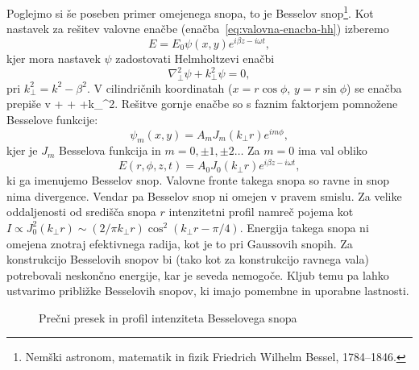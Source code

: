 Poglejmo si še poseben primer omejenega snopa, to je Besselov
snop\footnote{Nemški astronom, matematik in fizik Friedrich Wilhelm Bessel, 1784--1846.}. 
Kot nastavek za rešitev valovne enačbe (enačba~\ref{eq:valovna-enacba-hh})
izberemo
\begin{equation}
E=E_{0}\psi(x,y)e^{i\beta z-i\omega t},
\end{equation}
kjer mora nastavek $\psi$ zadostovati Helmholtzevi enačbi
\begin{equation}
\nabla_{\perp}^{2}\psi+k_{\perp}^{2}\psi=0,
\end{equation}
pri $k_{\perp}^{2}=k^{2}-\beta^{2}$. V cilindričnih
koordinatah ($x=r\cos\phi$, $y=r\sin\phi$) se enačba prepiše v 
\beq
{}+ 
+ +k_{\perp}^{2}.
\eeq
Rešitve gornje enačbe so s faznim faktorjem pomnožene Besselove funkcije:
\begin{equation}
\psi_m(x,y)=A_{m}J_{m}(k_{\perp}r)e^{im\phi},
\end{equation}
kjer je $J_{m}$ Besselova funkcija in $m=0,\pm1,\pm2 \ldots$ Za
$m=0$ ima val obliko
\begin{equation}
E(r,\phi,z,t)=A_{0}J_{0}(k_{\perp}r)e^{i\beta z-i \omega t},
\label{eq:Besselov-snop}
\end{equation}
ki ga imenujemo Besselov snop. Valovne fronte takega snopa so ravne 
in snop nima divergence. Vendar pa Besselov snop ni omejen v pravem smislu. Za 
velike oddaljenosti od središča snopa $r$ intenzitetni profil namreč pojema kot 
$I \propto J_{0}^{2}(k_{\perp}r)\sim (2/\pi k_{\perp}r)\cos^{2}(k_{\perp}r-\pi/4)$.
Energija takega snopa ni omejena znotraj efektivnega radija,
kot je to pri Gaussovih snopih. Za konstrukcijo Besselovih snopov
bi (tako kot za konstrukcijo ravnega vala) potrebovali neskončno energije,
kar je seveda nemogoče. Kljub temu pa lahko ustvarimo približke Besselovih 
snopov, ki imajo pomembne in uporabne lastnosti. 

\begin{figure}[h]
\centering
\def\svgwidth{80truemm} 

\caption{Prečni presek in profil intenziteta Besselovega snopa}
\label{fig:Besselov_presek}
\end{figure}


